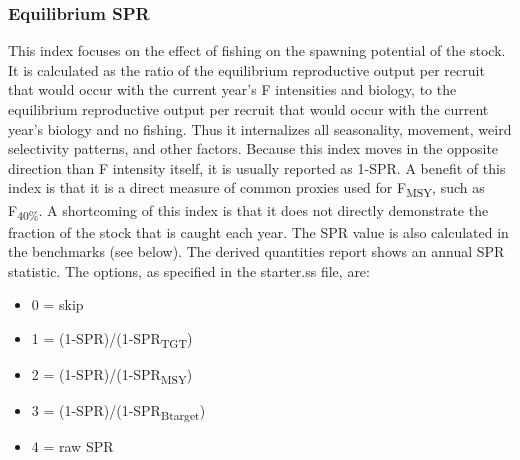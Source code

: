 \subsubsection{Equilibrium SPR}
This index focuses on the effect of fishing on the spawning potential of the stock.  It is calculated as the ratio of the equilibrium reproductive output per recruit that would occur with the current year’s F intensities and biology, to the equilibrium reproductive output per recruit that would occur with the current year’s biology and no fishing.  Thus it internalizes all seasonality, movement, weird selectivity patterns, and other factors.  Because this index moves in the opposite direction than F intensity itself, it is usually reported as 1-SPR.  A benefit of this index is that it is a direct measure of common proxies used for F\textsubscript{MSY}, such as F\textsubscript {40\%}.  A shortcoming of this index is that it does not directly demonstrate the fraction of the stock that is caught each year.  The SPR value is also calculated in the benchmarks (see below).  The derived quantities report shows an annual SPR statistic.  The options, as specified in the starter.ss file, are:
\begin{itemize}
	\item 0 = skip
	\item 1 = (1-SPR)/(1-SPR\textsubscript{TGT})
	\item 2 = (1-SPR)/(1-SPR\textsubscript{MSY})
	\item 3 = (1-SPR)/(1-SPR\textsubscript{Btarget})
	\item 4 = raw SPR
\end{itemize}

